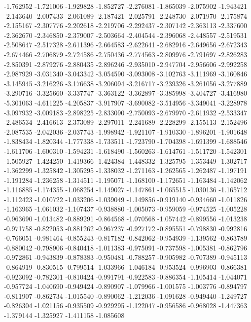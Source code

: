 -1.762952
-1.721006
-1.929828
-1.852727
-2.276081
-1.865039
-2.075902
-1.943421
-2.143640
-2.007433
-2.061089
-2.187421
-2.025791
-2.248730
-2.071970
-2.175874
-2.155167
-2.307776
-2.202618
-2.219706
-2.292437
-2.307142
-2.363113
-2.337600
-2.362670
-2.346850
-2.379007
-2.503664
-2.404544
-2.396068
-2.448557
-2.519531
-2.508647
-2.517328
-2.611396
-2.664583
-2.622641
-2.682916
-2.649656
-2.672343
-2.674466
-2.706879
-2.724586
-2.750436
-2.774563
-2.809976
-2.791697
-2.826283
-2.850391
-2.879276
-2.880435
-2.896246
-2.935010
-2.947704
-2.956606
-2.992258
-2.987929
-3.031340
-3.043342
-3.054590
-3.093008
-3.102763
-3.111969
-3.160846
-3.145945
-3.216226
-3.176638
-3.206094
-3.216717
-3.239326
-3.261056
-3.277889
-3.290716
-3.325660
-3.337747
-3.363122
-3.362897
-3.385998
-3.404727
-3.416980
-5.301063
-4.611225
-4.205837
-3.917907
-3.690082
-3.514956
-3.349041
-3.228978
-3.097932
-3.009183
-2.898225
-2.833090
-2.750093
-2.679970
-2.611932
-2.533347
-2.486534
-2.416613
-2.373089
-2.297011
-2.241689
-2.228299
-2.155113
-2.152496
-2.087535
-2.042036
-2.037743
-1.998942
-1.921107
-1.910330
-1.896201
-1.901648
-1.838434
-1.820344
-1.777338
-1.733511
-1.723790
-1.704398
-1.691399
-1.688546
-1.611706
-1.600310
-1.594231
-1.618490
-1.560263
-1.614761
-1.511720
-1.542301
-1.505927
-1.424250
-1.419366
-1.424384
-1.448332
-1.325795
-1.353449
-1.302717
-1.362299
-1.325842
-1.305295
-1.338032
-1.271163
-1.262565
-1.262487
-1.197191
-1.191284
-1.236258
-1.314511
-1.195071
-1.168100
-1.172651
-1.163484
-1.142062
-1.116885
-1.174355
-1.068254
-1.149027
-1.147861
-1.065515
-1.030136
-1.165712
-1.112423
-1.010722
-1.033206
-1.039049
-1.149856
-0.919140
-0.934660
-1.011826
-1.163965
-1.061032
-1.107437
-0.938880
-1.005073
-0.959059
-0.974525
-1.005228
-0.963690
-1.013482
-0.889291
-0.864568
-1.070568
-1.057442
-0.899556
-1.013238
-0.971758
-0.822053
-0.881262
-0.967237
-0.927172
-0.895551
-0.798830
-0.992816
-0.766051
-0.981464
-0.855243
-0.817182
-0.842062
-0.954939
-1.139562
-0.863789
-0.880042
-0.798906
-0.840418
-1.011383
-0.975091
-0.737598
-1.005381
-0.862796
-0.972861
-0.943839
-0.878383
-0.950481
-0.788257
-0.905982
-0.707389
-0.945113
-0.864919
-0.830515
-0.799514
-1.033966
-1.046184
-0.953524
-0.996903
-0.866381
-0.923092
-0.782301
-0.810424
-0.991791
-0.922583
-0.886354
-1.105414
-1.044071
-0.957724
-1.040690
-0.949424
-0.890907
-1.079966
-1.001575
-1.003776
-0.894797
-0.811907
-0.862734
-1.015540
-0.890062
-1.212036
-1.091628
-0.949440
-1.249727
-0.826304
-1.021156
-0.935509
-0.929295
-1.122047
-0.956586
-0.968028
-1.447363
-1.379144
-1.325927
-1.411158
-1.085608
